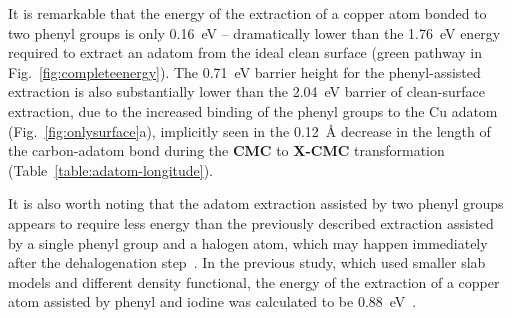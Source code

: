 \documentclass[aps,prb,reprint,amsmath,amssymb]{revtex4-1}
\newcommand{\lock}{\color{red}}
\newcommand{\zhzh}{\color{blue}}
\newcommand{\lock}{\color{black}}
\newcommand{\zhzh}{\color{blue}}
\newcommand{\comm}{\color{green}} %
\begin{document}
{\lock

It is remarkable that the energy of the extraction of a copper atom bonded to two phenyl groups is only \SI{0.16}{\electronvolt} -- dramatically lower than the \SI{1.76}{\electronvolt} energy required to extract an adatom from the ideal clean surface (green pathway in Fig.~\ref{fig:completeenergy}). The \SI{0.71}{\electronvolt} barrier height for the phenyl-assisted extraction is also substantially lower than the \SI{2.04}{\electronvolt} barrier of clean-surface extraction, due to the increased binding of the phenyl groups to the Cu adatom (Fig.~\ref{fig:onlysurface}a), implicitly seen in the \SI{0.12}{\angstrom} decrease in the length of the carbon-adatom bond during the \textbf{CMC} to \textbf{X-CMC} transformation (Table~\ref{table:adatom-longitude}).

It is also worth noting that the adatom extraction assisted by two phenyl groups appears to require less energy than the previously described extraction assisted by a single phenyl group and a halogen atom, which may happen immediately after the dehalogenation step~\cite{chemeurope2017}. 
In the previous study, which used smaller slab models and different density functional, the energy of the extraction of a copper atom assisted by phenyl and iodine was calculated to be \SI{0.88}{\electronvolt}~\cite{chemeurope2017}. %

}
\end{document}
